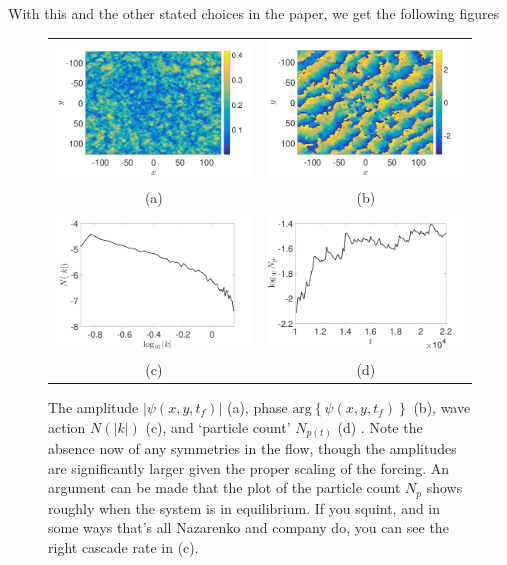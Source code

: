 \documentclass[a4paper,11pt]{article}
\begin{document}
With this and the other stated choices in the paper, we get the following figures 
\begin{figure}
\centering
\begin{tabular}{cc}
\includegraphics[width=.5\textwidth]{amplitude_K_128_Lx_128_tf_1pt3e4} & \includegraphics[width=.5\textwidth]{phase_K_128_Lx_128_tf_1pt3e4}\\
(a) & (b) \\
\includegraphics[width=.5\textwidth]{action_cascade_K_128_Lx_128_tf_1pt3e4} & \includegraphics[width=.5\textwidth]{np_count_K_128_Lx_128_tf_1pt3e4}\\
(c) & (d)
\end{tabular}
\caption{The amplitude $\left|\psi(x,y,t_{f})\right|$ (a), phase $\mbox{arg}\left\{\psi(x,y,t_{f})\right\}$ (b), wave action $N(|k|)$ (c), and `particle count' $N_{p(t)}$ (d) .  Note the absence now of any symmetries in the flow, though the amplitudes are significantly larger given the proper scaling of the forcing. An argument can be made that the plot of the particle count $N_{p}$ shows roughly when the system is in equilibrium. If you squint, and in some ways that's all Nazarenko and company do, you can see the right cascade rate in (c).}
\end{figure}
\end{document}
